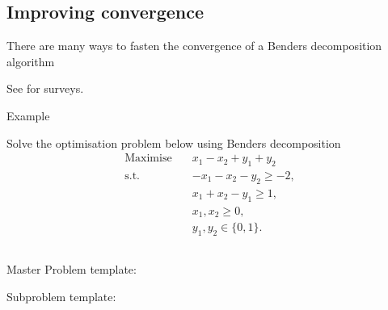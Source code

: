 \vfill


\subsection*{Improving convergence}

There are many ways to fasten the convergence of a Benders decomposition algorithm \cite{mcdaniel77modified,magnanti81accelerating,papadakos08practical,costa12accelerating,crainic21partial} 

See \cite{costa05survey,rahmaniani17benders} for surveys.


\newpage

\begin{bclogo}[logo=\bccrayon]{\small Example }
\vspace{.2cm} \small


Solve the optimisation problem below using Benders decomposition
\begin{align*}
\textrm{Maximise} \quad &  x_1 - x_2 + y_1 + y_2 \\
\textrm{s.t.} \quad & -x_1 - x_2 - y_2 \geq -2, \\
& x_1 +  x_2 - y_1 \geq 1, \\
& x_1, x_2 \geq 0, \\
& y_1, y_2 \in \{0,1\}.
\end{align*}
\end{bclogo}
\vspace{0.1cm}

\newpage

\subsection*{}

\begin{bclogo}[logo=\bcinfo]{\small Master Problem template:}
\vspace{.2cm} \tiny

\end{bclogo}



\begin{bclogo}[logo=\bcinfo]{\small Subproblem template:}
\vspace{.2cm} \tiny



\end{bclogo}

\newpage

